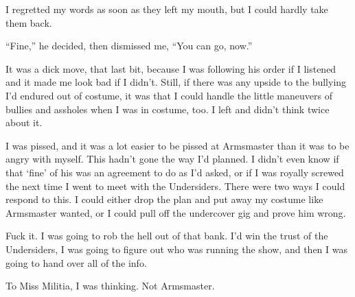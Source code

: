 I regretted my words as soon as they left my mouth, but I could hardly take them back.



``Fine,'' he decided, then dismissed me, ``You can go, now.''



It was a dick move, that last bit, because I was following his order if I listened and it made me look bad if I didn't.  Still, if there was any upside to the bullying I'd endured out of costume, it was that I could handle the little maneuvers of bullies and assholes when I was in costume, too.  I left and didn't think twice about it.



I was pissed, and it was a lot easier to be pissed at Armsmaster than it was to be angry with myself.  This hadn't gone the way I'd planned.  I didn't even know if that `fine' of his was an agreement to do as I'd asked, or if I was royally screwed the next time I went to meet with the Undersiders.  There were two ways I could respond to this.  I could either drop the plan and put away my costume like Armsmaster wanted, or I could pull off the undercover gig and prove him wrong.



Fuck it.  I was going to rob the hell out of that bank.  I'd win the trust of the Undersiders, I was going to figure out who was running the show, and then I was going to hand over all of the info.



To Miss Militia, I was thinking.  Not Armsmaster.


















